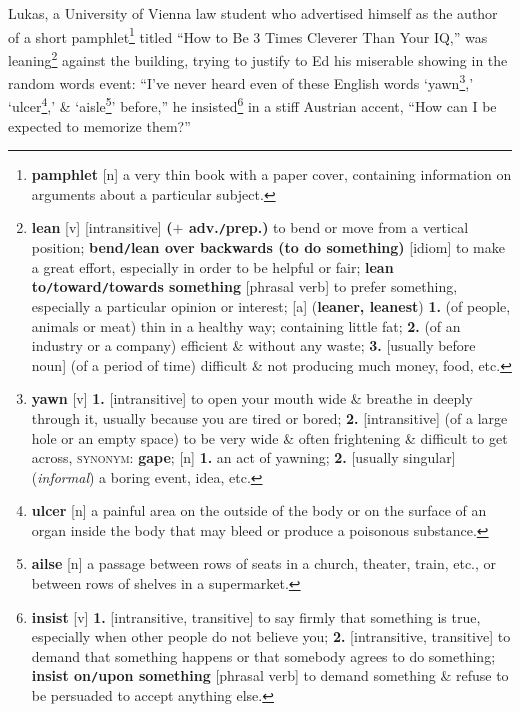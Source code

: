 \documentclass[oneside]{book}
\numberwithin{equation}{section}
\begin{document}
Lukas, a University of Vienna law student who advertised himself as the author of a short pamphlet\footnote{\textbf{pamphlet} [n] a very thin book with a paper cover, containing information on arguments about a particular subject.} titled ``How to Be 3 Times Cleverer Than Your IQ,'' was leaning\footnote{\textbf{lean} [v] [intransitive] \textbf{($+$ adv.\texttt{/}prep.)} to bend or move from a vertical position; \textbf{bend\texttt{/}lean over backwards (to do something)} [idiom] to make a great effort, especially in order to be helpful or fair; \textbf{lean to\texttt{/}toward\texttt{/}towards something} [phrasal verb] to prefer something, especially a particular opinion or interest; [a] (\textbf{leaner, leanest}) \textbf{1.} (of people, animals or meat) thin in a healthy way; containing little fat; \textbf{2.} (of an industry or a company) efficient \& without any waste; \textbf{3.} [usually before noun] (of a period of time) difficult \& not producing much money, food, etc.} against the building, trying to justify to Ed his miserable showing in the random words event: ``I've never heard even of these English words `yawn\footnote{\textbf{yawn} [v] \textbf{1.} [intransitive] to open your mouth wide \& breathe in deeply through it, usually because you are tired or bored; \textbf{2.} [intransitive] (of a large hole or an empty space) to be very wide \& often frightening \& difficult to get across, \textsc{synonym}: \textbf{gape}; [n] \textbf{1.} an act of yawning; \textbf{2.} [usually singular] (\textit{informal}) a boring event, idea, etc.},' `ulcer\footnote{\textbf{ulcer} [n] a painful area on the outside of the body or on the surface of an organ inside the body that may bleed or produce a poisonous substance.},' \& `aisle\footnote{\textbf{ailse} [n] a passage between rows of seats in a church, theater, train, etc., or between rows of shelves in a supermarket.}' before,'' he insisted\footnote{\textbf{insist} [v] \textbf{1.} [intransitive, transitive] to say firmly that something is true, especially when other people do not believe you; \textbf{2.} [intransitive, transitive] to demand that something happens or that somebody agrees to do something; \textbf{insist on\texttt{/}upon something} [phrasal verb] to demand something \& refuse to be persuaded to accept anything else.} in a stiff Austrian accent, ``How can I be expected to memorize them?''
\end{document}
